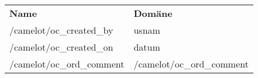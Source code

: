 \begin{tabu}{p{0.5\textwidth}p{0.45\textwidth }}
\rowfont{\bfseries\leavevmode\color{headingfont}}\textbf{Name} & \textbf{Domäne} \\
/camelot/oc\_created\_by & usnam \\
/camelot/oc\_created\_on & datum \\
/camelot/oc\_ord\_comment & /camelot/oc\_ord\_comment \\
\end{tabu}